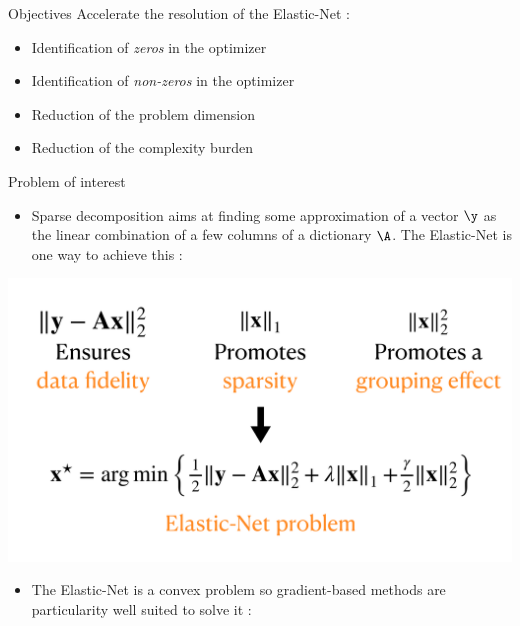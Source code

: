 \documentclass[final]{beamer}
\newcommand{\emphone}[1]{\textit{\color{norange}#1}}
\newlength{\onecolwid}
\begin{document}
\begin{frame}[t]
\begin{columns}[t]
\begin{column}{\onecolwid}
    \begin{alertblock}{Objectives}
        Accelerate the resolution of the Elastic-Net :
        \begin{itemize}
            \item \hspace{0.1in} Identification of \emphone{zeros} in the optimizer
            \item \hspace{0.1in} Identification of \emphone{non-zeros} in the optimizer
            \item \hspace{0.1in} Reduction of the problem dimension
            \item \hspace{0.1in} Reduction of the complexity burden
        \end{itemize}
    \end{alertblock}
    \begin{block}{Problem of interest}
        \begin{itemize}
            \item \hspace{0.1in} Sparse decomposition aims at finding some approximation of a vector \(\obs\) as the linear combination of a few columns of a dictionary \(\dic\).
            The Elastic-Net is one way to achieve this :
        \end{itemize}
        \includegraphics[width=\linewidth]{elastic-net.pdf}
        \vspace{-2cm}
        \begin{itemize}
            \item \hspace{0.1in} The Elastic-Net is a convex problem so gradient-based methods are particularity well suited to solve it :

\end{itemize}
\end{block}
\end{column}
\end{columns}
\end{frame}
\end{document}
